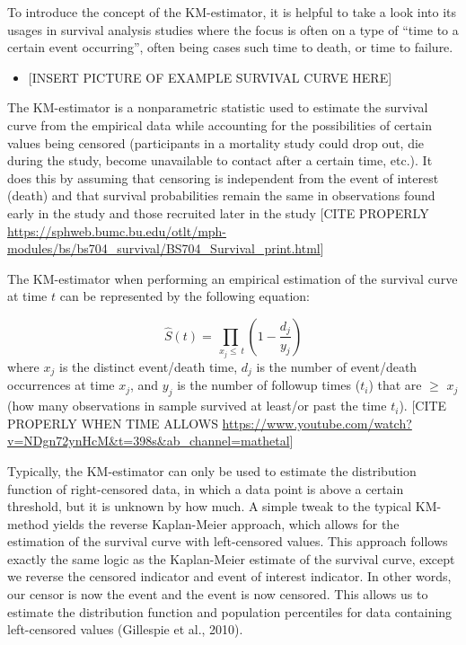 \documentclass[12pt, twoside]{amherstthesis}
\providecommand{\tightlist}{%
  \setlength{\itemsep}{0pt}\setlength{\parskip}{0pt}}
\begin{document}
To introduce the concept of the KM-estimator, it is helpful to take a look into its usages in survival analysis studies where the focus is often on a type of ``time to a certain event occurring'', often being cases such time to death, or time to failure.
\begin{itemize}
\tightlist
\item
  {[}INSERT PICTURE OF EXAMPLE SURVIVAL CURVE HERE{]}
\end{itemize}
The KM-estimator is a nonparametric statistic used to estimate the survival curve from the empirical data while accounting for the possibilities of certain values being censored (participants in a mortality study could drop out, die during the study, become unavailable to contact after a certain time, etc.). It does this by assuming that censoring is independent from the event of interest (death) and that survival probabilities remain the same in observations found early in the study and those recruited later in the study {[}CITE PROPERLY \url{https://sphweb.bumc.bu.edu/otlt/mph-modules/bs/bs704_survival/BS704_Survival_print.html}{]}

The KM-estimator when performing an empirical estimation of the survival curve at time \(t\) can be represented by the following equation:

\[\hat{S}(t) = \prod_{\ x_j \le \ t }(1-\frac{d_j}{y_j})\]
where \(x_j\) is the distinct event/death time, \(d_j\) is the number of event/death occurrences at time \(x_j\), and \(y_j\) is the number of followup times (\(t_i\)) that are \(\ge\) \(x_j\) (how many observations in sample survived at least/or past the time \(t_i\)). {[}CITE PROPERLY WHEN TIME ALLOWS \url{https://www.youtube.com/watch?v=NDgn72ynHcM\&t=398s\&ab_channel=mathetal}{]}

Typically, the KM-estimator can only be used to estimate the distribution function of right-censored data, in which a data point is above a certain threshold, but it is unknown by how much. A simple tweak to the typical KM-method yields the reverse Kaplan-Meier approach, which allows for the estimation of the survival curve with left-censored values. This approach follows exactly the same logic as the Kaplan-Meier estimate of the survival curve, except we reverse the censored indicator and event of interest indicator. In other words, our censor is now the event and the event is now censored. This allows us to estimate the distribution function and population percentiles for data containing left-censored values (Gillespie et al., 2010).
\end{document}

